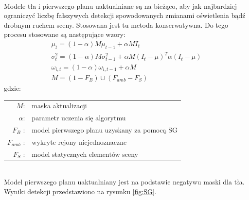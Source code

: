 \paragraph{}
Modele tła i pierwszego planu uaktualniane są na bieżąco, aby jak najbardziej ograniczyć liczbę fałszywych detekcji spowodowanych zmianami oświetlenia bądź drobnym ruchem sceny. Stosowana jest tu metoda konserwatywna. Do tego procesu stosowane są następujące wzory:
\begin{gather}
\mu_{t} = (1-\alpha)M\mu_{t-1}+\alpha MI_{t} \\
\sigma_{t}^2 = (1-\alpha)M\sigma_{t-1}^2+\alpha M(I_{t}-\mu)^{T}\alpha(I_{t}-\mu) \\
\omega_{i,t} = (1-\alpha)\omega_{i,t-1}+\alpha M \\
M = (1-F_{B})\cup(F_{amb}-F_{S})
\end{gather}
gdzie:\\ 
\hspace*{3em}
\begin{tabular}{r l}
$M$: &  maska aktualizacji\\
$\alpha$: & parametr uczenia się algorytmu\\
$F_{B}$ : & model pierwszego planu uzyskany za pomocą SG\\
$F_{amb}$ : & wykryte rejony niejednoznaczne \\
$F_{S}$ : & model statycznych elementów sceny
\end{tabular} \\

Model pierwszego planu uaktualniany jest na podstawie negatywu maski dla tła. Wyniki detekcji przedstawiono na rysunku \ref{fig:SG}.

